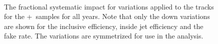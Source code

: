 {\begin{figure}[h!]
  \centering
   \\
  \caption{The fractional systematic impact for variations applied to the tracks for the \powheg+\pythia~samples for all years. Note that only the down variations are shown for the inclusive efficiency, inside jet efficiency and the fake rate.
  The variations are symmetrized for use in the analysis.}
  \label{fig:PP8TrackSyst}
\end{figure}

}
